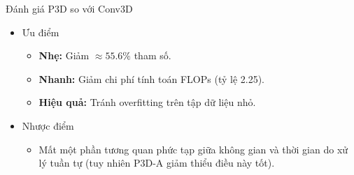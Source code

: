 \begin{frame}{Đánh giá P3D so với Conv3D}
    \begin{itemize}
        \item Ưu điểm
              \begin{itemize}
                  \item \textbf{Nhẹ:} Giảm $\approx 55.6\%$ tham số.
                  \item \textbf{Nhanh:} Giảm chi phí tính toán FLOPs (tỷ lệ 2.25).
                  \item \textbf{Hiệu quả:} Tránh overfitting trên tập dữ liệu nhỏ.
              \end{itemize}
        \item Nhược điểm
              \begin{itemize}
                  \item Mất một phần tương quan phức tạp giữa không gian và thời gian do xử lý tuần tự (tuy nhiên P3D-A giảm thiểu điều này tốt).
              \end{itemize}
    \end{itemize}

\end{frame}

